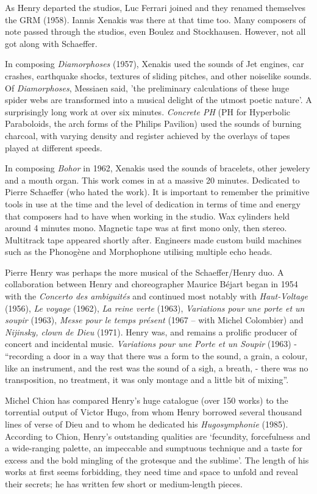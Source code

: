 As Henry departed the studios, Luc Ferrari joined and they renamed themselves the GRM (1958). Iannis Xenakis was there at that time too. Many composers of note passed through the studios, even Boulez and Stockhausen. However, not all got along with
Schaeffer.

In composing \textit{Diamorphoses} (1957), Xenakis used the sounds of Jet engines, car crashes, earthquake shocks, textures of sliding pitches, and other noiselike sounds. Of \textit{Diamorphoses}, Messiaen said, 'the preliminary calculations of these huge spider webs are transformed into a musical delight of the utmost poetic nature'. A surprisingly long work at over six minutes. \textit{Concrete PH} (PH for Hyperbolic Paraboloids, the arch forms of the Philips Pavilion) used the sounds of burning charcoal, with varying density and register achieved by the overlays of tapes played at different speeds.

In composing \textit{Bohor} in 1962, Xenakis used the sounds of bracelets, other jewelery and a mouth organ. This work comes in at a massive 20 minutes. Dedicated to Pierre Schaeffer (who hated the work). It is important to remember the primitive tools in use at the time and the level of dedication in terms of time and energy that composers had to have when working in the studio. Wax cylinders held around 4 minutes mono. Magnetic tape was at first mono only, then stereo. Multitrack tape appeared shortly after. Engineers made custom build machines such as the Phonog\`ene and Morphophone utilising multiple echo heads.

Pierre Henry was perhaps the more musical of the Schaeffer/Henry duo. A collaboration between Henry and choreographer Maurice Béjart began in 1954 with the \textit{Concerto des ambiguit\'es} and continued most notably with \textit{Haut-Voltage} (1956), \textit{Le voyage} (1962), \textit{La reine verte} (1963), \textit{Variations pour une porte et un soupir} (1963), \textit{Messe pour le temps
pr\'esent} (1967 – with Michel Colombier) and \textit{Nijinsky, clown de Dieu} (1971). Henry was, and remains a prolific producer of concert and incidental music. \textit{Variations pour une Porte et un Soupir} (1963) - ``recording a door in a way that there was
a form to the sound, a grain, a colour, like an instrument, and the rest was the sound of a sigh, a breath, - there was no transposition, no treatment, it was only montage and a little bit of mixing''.

Michel Chion has compared Henry's huge catalogue (over 150 works) to the torrential output of Victor Hugo, from whom Henry borrowed several thousand lines of verse of Dieu and to whom he dedicated his \textit{Hugosymphonie} (1985). According to Chion, Henry's
outstanding qualities are `fecundity, forcefulness and a wide-ranging palette, an impeccable and sumptuous technique and a taste for excess and the bold mingling of the grotesque and the sublime'. The length of his works at first seems forbidding, they need
time and space to unfold and reveal their secrets; he has written few short or medium-length pieces.

